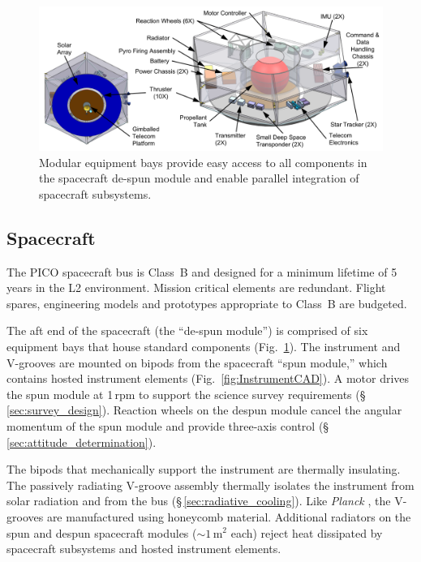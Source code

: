 \begin{figure}
\begin{center}
\includegraphics[width=\textwidth]{figures/Spacecraft.png}
\caption{\captiontext 
  Modular equipment bays provide easy access to all components
  in the spacecraft de-spun module and enable parallel integration of
  spacecraft subsystems.\label{fig:Spacecraft}}
\end{center}
\end{figure}

\subsection{Spacecraft}
\label{sec:spacecraft} %

The PICO spacecraft bus is Class~B and designed for a minimum lifetime of 5\,years in the L2
environment. Mission critical elements are redundant. Flight spares,
engineering models and prototypes appropriate to Class~B are budgeted.

The aft end of the spacecraft (the ``de-spun module'') is comprised of
six equipment bays that house standard components
(Fig.~\ref{fig:Spacecraft}).  The instrument and V-grooves are mounted on
bipods from the spacecraft ``spun module,'' which contains hosted
instrument elements (Fig.~\ref{fig:InstrumentCAD}). A motor drives the
spun module at 1\,rpm to support the science survey requirements
(\S\,\ref{sec:survey_design}). Reaction wheels on the despun module
cancel the angular momentum of the spun module and provide three-axis
control (\S\,\ref{sec:attitude_determination}).

The bipods that mechanically support the instrument are thermally
insulating. The passively radiating V-groove assembly thermally
isolates the instrument from solar radiation and from the bus
(\S\,\ref{sec:radiative_cooling}). Like \textit{Planck} \citep{Tauber2010}, the V-grooves are
manufactured using honeycomb material. Additional radiators on the
spun and despun spacecraft modules ($\sim1$\,m$^2$ each) reject heat
dissipated by spacecraft subsystems and hosted instrument elements.

